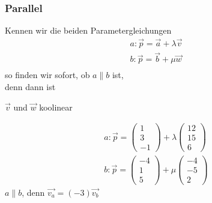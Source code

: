 \subsubsection{Parallel}
Kennen wir die beiden Parametergleichungen 
\begin{eqnarray*}
	a: \vec{p} = \vec{a} + \lambda \vec{v}\\
	b: \vec{p} = \vec{b} + \mu\vec{w}\\
\end{eqnarray*}
so finden wir sofort, ob $a \parallel b$ ist,\\
denn dann ist
\begin{center}
$\vec{v}$ und $\vec{w}$ koolinear
\end{center}
\begin{myexample}
	\begin{eqnarray*}
		a: \vec{p} = \begin{pmatrix}1\\3\\-1\end{pmatrix}+ \lambda \begin{pmatrix}12\\15\\6\end{pmatrix}\\
		b: \vec{p} = \begin{pmatrix}-4\\1\\5\end{pmatrix} + \mu \begin{pmatrix}-4\\-5\\2\end{pmatrix}
	\end{eqnarray*}
	$a \parallel b$, denn $\vec{v_a} = (-3)\vec{v_b}$
\end{myexample}
\newpage
